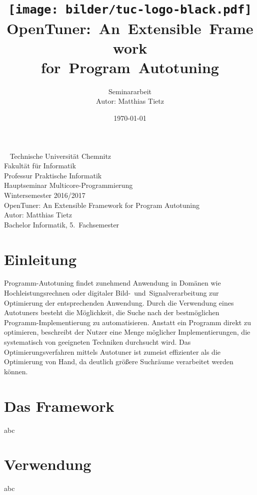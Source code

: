 \documentclass[a4paper,11pt]{scrartcl}
\title{\texttt{[image: bilder/tuc-logo-black.pdf]}
    OpenTuner:~An~Extensible~Framework\\for~Program~Autotuning
}
\author{Seminararbeit\\Autor: Matthias Tietz}
\date{\today}
\begin{document}
\maketitle \thispagestyle{empty} \newpage

\thispagestyle{empty}
~
\vfill
\noindent %
Technische Universität Chemnitz\\
Fakultät für Informatik\\
Professur Praktische Informatik\\
Hauptseminar Multicore-Programmierung\\
Wintersemester 2016/2017\\

\noindent
OpenTuner: An Extensible Framework for Program Autotuning\\
Autor: Matthias Tietz\\
Bachelor Informatik, 5.~Fachsemester

\newpage
\tableofcontents \newpage



\section{Einleitung}

Programm-Autotuning findet zunehmend Anwendung in Domänen wie Hochleistungsrechnen oder
digitaler Bild-~und~Signalverarbeitung zur Optimierung der entsprechenden Anwendung.
Durch die Verwendung eines Autotuners besteht die Möglichkeit, die Suche nach der
bestmöglichen Programm-Implementierung zu automatisieren. Anstatt ein Programm direkt
zu optimieren, beschreibt der Nutzer eine Menge möglicher Implementierungen, die 
systematisch von geeigneten Techniken durchsucht wird. Das Optimierungsverfahren
mittels Autotuner ist zumeist effizienter als die Optimierung von Hand, da deutlich größere
Suchräume verarbeitet werden können.




\section{Das Framework}
abc

\section{Verwendung}
abc
\end{document}
